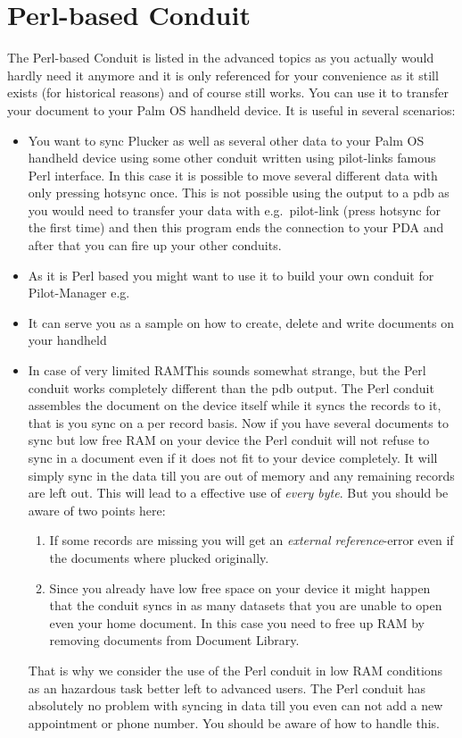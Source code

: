 \section{Perl-based Conduit}

The Perl-based Conduit is listed in the advanced topics as you
actually would hardly need it anymore and it is only referenced for
your convenience as it still exists (for historical reasons) and of
course still works. You can use it to transfer your document to your
Palm OS handheld device. It is useful in several scenarios:

\begin{itemize}
  \item You want to sync Plucker as well as several other data to
  your Palm OS handheld device using some other conduit written using 
  pilot-links famous Perl interface. In this case it is possible to 
  move several different data with only pressing hotsync once. This is 
  not possible using the output to a pdb as you would need to transfer 
  your data with e.g.\ pilot-link (press hotsync for the first time) and 
  then this program ends the connection to your PDA and after that you 
  can fire up your other conduits.

  \item As it is Perl based you might want to use it to build your own
  conduit for Pilot-Manager e.g.

  \item It can serve you as a sample on how to create, delete and
  write documents on your handheld

  \item In case of very limited RAM\. This sounds somewhat strange, but
  the Perl conduit works completely different than the pdb output. The
  Perl conduit assembles the document on the device itself while it 
  syncs the records to it, that is you sync on a per record basis. Now if
  you have several documents to sync but low free RAM on your
  device the Perl conduit will not refuse to sync in a document even
  if it does not fit to your device completely. It will simply sync in
  the data till you are out of memory and any remaining records are left 
  out. This will lead to a effective use of \emph{every byte}. But you 
  should be aware of two points here:
  \begin{enumerate}
    \item If some records are missing you will get an \emph{external
    reference}-error even if the documents where plucked originally.

    \item Since you already have low free space on your device it might 
    happen that the conduit syncs in as many datasets that you are unable 
    to open even your home document. In this case you need to free up RAM
    by removing documents from Document Library.
  \end{enumerate}
  That is why we consider the use of the Perl conduit in low RAM conditions 
  as an hazardous task better left to advanced users. The Perl
  conduit has absolutely no problem with syncing in data till you even
  can not add a new appointment or phone number. You should be aware
  of how to handle this.
\end{itemize}


